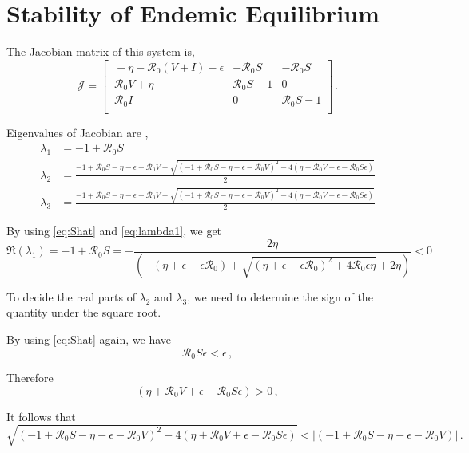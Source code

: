 \documentclass[12pt]{article}
\newcommand{\R}{\mathcal{R}}
\begin{document}
\section{Stability of Endemic Equilibrium}

The Jacobian matrix of this system is,
\begin{equation}
\mathcal{J} =
\begin{bmatrix}
    \ -\eta-\R_0 (V+I)-\epsilon       & -\R_0 S     &-\R_0 S\\
    \ \R_0 V+\eta       & \R_0 S-1    &0\\
    \ \R_0 I       &0     &\R_0 S-1\\
\end{bmatrix}\,.
\end{equation}

Eigenvalues of Jacobian are ,
\begin{subequations}
\begin{align}
\lambda_1&=-1+\R_0 S \label{eq:lambda1}\\
\lambda_2&=\frac{-1+\R_0 S-\eta-\epsilon-\R_0 V+\sqrt{(-1+\R_0 S-\eta-\epsilon-\R_0 V)^2-4(\eta+\R_0 V+\epsilon-\R_0 S\epsilon)}}{2}\\
\lambda_3&=\frac{-1+\R_0 S-\eta-\epsilon-\R_0 V-\sqrt{(-1+\R_0 S-\eta-\epsilon-\R_0 V)^2-4(\eta+\R_0 V+\epsilon-\R_0 S\epsilon)}}{2}
\end{align}
\end{subequations}

By using \autoref{eq:Shat} and \autoref{eq:lambda1}, we get
\begin{equation}
\Re(\lambda_1)=-1+\R_0 S=-\frac{2\eta}{(-(\eta+\epsilon-\epsilon\R_0)+\sqrt{(\eta+\epsilon-\epsilon\R_0)^2+4\R_0\epsilon \eta}+2\eta)}<0
\end{equation}

To decide the real parts of $\lambda_2$ and $\lambda_3$, we need to determine the sign of the quantity under the square root.

By using \autoref{eq:Shat} again, we have
\begin{equation}
\R_0 S\epsilon<\epsilon\,,
\end{equation}

Therefore
\begin{equation}
(\eta+\R_0 V+\epsilon-\R_0 S\epsilon)>0\,,
\end{equation}

It follows that
\begin{equation}
\sqrt{(-1+\R_0 S-\eta-\epsilon-\R_0 V)^2-4(\eta+\R_0 V+\epsilon-\R_0 S\epsilon)}<|(-1+\R_0 S-\eta-\epsilon-\R_0 V)|\,.
\end{equation}
\end{document}
